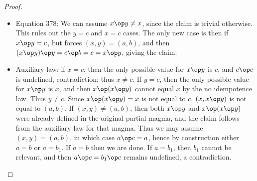\begin{proof}
\begin{itemize}
  \item Equation 378:  We can assume $x \op y \neq x$, since the claim is trivial otherwise.  This rules out the $y=c$ and $x=c$ cases.  The only new case is then if $x \op y = c$, but forces $(x,y) = (a,b)$, and then $(x \op y) \op y = c \op b = c = x \op y$, giving the claim.
  \item Auxiliary law: if $x=c$, then the only possible value for $x \op y$ is $c$, and $c \op c$ is undefined, contradiction; thus $x \neq c$.  If $y = c$, then the only possible value for $x \op y$ is $x$, and then $x \op (x \op y)$ cannot equal $x$ by the no idempotence law.  Thus $y \neq c$.  Since $x \op (x \op y) = x$ is not equal to $c$, $(x,x \op y)$ is not equal to $(a,b)$.  If $(x,y) \neq (a,b)$, then both $x \op y$ and $x \op (x \op y)$ were already defined in the original partial magma, and the claim follows from the auxiliary law for that magma.  Thus we may assume $(x,y) = (a,b)$, in which case $a \op c = a$, hence by construction either $a=b$ or $a=b_1$.  If $a=b$ then we are done.  If $a = b_1$, then $b_1$ cannot be relevant, and then $a \op c = b_1 \op c$ remains undefined, a contradiction.
\end{itemize}


\end{proof}
